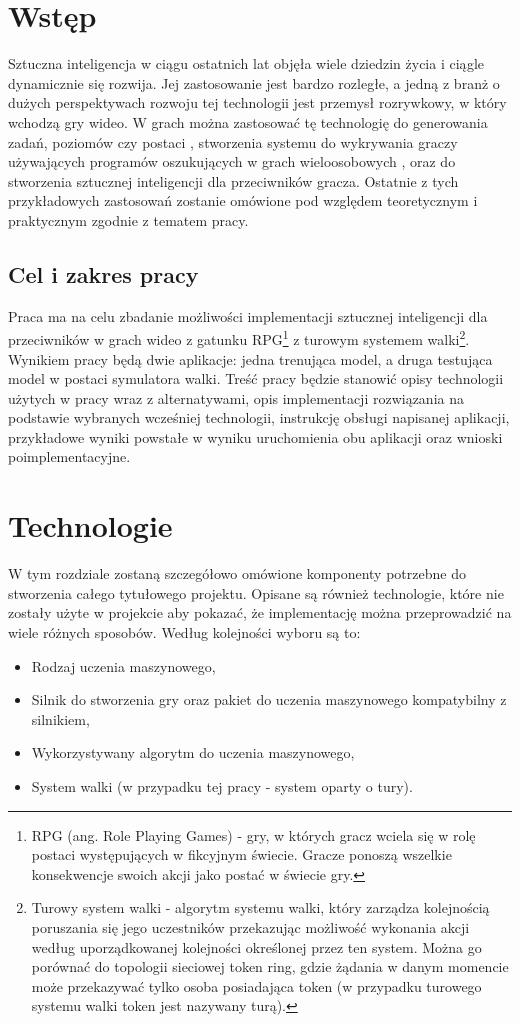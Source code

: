 \documentclass{SGGW-thesis}
\begin{document}
\chapter{Wstęp}
Sztuczna inteligencja w ciągu ostatnich lat objęła wiele dziedzin życia i ciągle dynamicznie się rozwija. 
Jej zastosowanie jest bardzo rozległe, a jedną z branż o dużych perspektywach rozwoju tej technologii jest przemysł rozrywkowy, 
w który wchodzą gry wideo. W grach można zastosować tę technologię do generowania zadań, poziomów czy postaci \cite{proceduralgen}, 
stworzenia systemu do wykrywania graczy używających programów oszukujących w grach wieloosobowych \cite{cheating}, oraz do stworzenia 
sztucznej inteligencji dla przeciwników gracza. Ostatnie z tych przykładowych zastosowań zostanie omówione pod względem teoretycznym i praktycznym 
zgodnie z tematem pracy.

\section{Cel i zakres pracy}
Praca ma na celu zbadanie możliwości implementacji sztucznej inteligencji dla przeciwników w grach wideo z gatunku RPG\footnote{RPG (ang. Role Playing Games)
- gry, w których gracz wciela się w rolę postaci występujących w fikcyjnym świecie. Gracze ponoszą wszelkie konsekwencje swoich akcji jako postać w świecie gry.}
z turowym systemem walki\footnote{Turowy system walki - algorytm systemu walki, który zarządza kolejnością poruszania się jego uczestników przekazując możliwość wykonania akcji według uporządkowanej kolejności określonej przez ten system. Można go porównać do topologii sieciowej token ring, gdzie żądania w danym momencie może przekazywać tylko osoba posiadająca token (w przypadku turowego systemu walki token jest nazywany turą).}. 
Wynikiem pracy będą dwie aplikacje: jedna trenująca model, a druga testująca model w postaci symulatora walki. 
Treść pracy będzie stanowić opisy technologii użytych w pracy wraz z alternatywami, opis implementacji rozwiązania na podstawie wybranych 
wcześniej technologii, instrukcję obsługi napisanej aplikacji, przykładowe wyniki powstałe w wyniku uruchomienia obu aplikacji oraz wnioski poimplementacyjne.

\chapter{Technologie}
W tym rozdziale zostaną szczegółowo omówione komponenty potrzebne do stworzenia całego tytułowego projektu. Opisane są również technologie, które nie zostały użyte w projekcie aby pokazać, że implementację można przeprowadzić na wiele różnych sposobów. Według kolejności wyboru są to: 
\begin{itemize}
  \item{Rodzaj uczenia maszynowego},
  \item{Silnik do stworzenia gry oraz pakiet do uczenia maszynowego kompatybilny z silnikiem},
  \item{Wykorzystywany algorytm do uczenia maszynowego},
  \item{System walki (w przypadku tej pracy - system oparty o tury)}.
\end{itemize}
\end{document}
